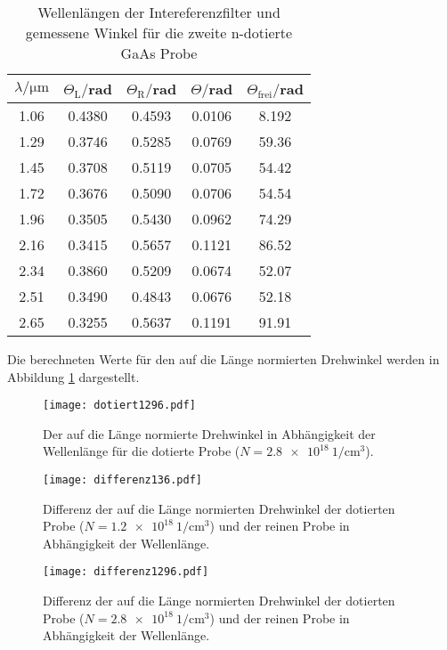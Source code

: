 \begin{table}[H]
  \centering
  \caption{Wellenlängen der Intereferenzfilter und gemessene Winkel für die zweite n-dotierte GaAs Probe}
  \label{tab:Parameter}
  \begin{tabular}{c c c c c}
    \toprule
    $\lambda/\mathrm{\mu m}$ & $\Theta_{\mathrm{L}}/$rad & $\Theta_{\mathrm{R}}/$rad  & $\Theta /$rad & $\Theta_{\mathrm{frei}}/$rad\\
    \midrule
    1.06  & 0.4380 & 0.4593 & 0.0106 & 8.192 \\
    1.29  & 0.3746 & 0.5285 & 0.0769 & 59.36 \\
    1.45  & 0.3708 & 0.5119 & 0.0705 & 54.42 \\
    1.72  & 0.3676 & 0.5090 & 0.0706 & 54.54 \\
    1.96  & 0.3505 & 0.5430 & 0.0962 & 74.29 \\
    2.16  & 0.3415 & 0.5657 & 0.1121 & 86.52 \\
    2.34  & 0.3860 & 0.5209 & 0.0674 & 52.07 \\
    2.51  & 0.3490 & 0.4843 & 0.0676 & 52.18 \\
    2.65  & 0.3255 & 0.5637 & 0.1191 & 91.91 \\
    \bottomrule
  \end{tabular}
\end{table}


Die berechneten Werte für den auf die Länge normierten Drehwinkel werden
in Abbildung \ref{fig:rein} dargestellt.
\begin{figure}[H]
  \centering
  \texttt{[image: dotiert1296.pdf]}
  \caption{Der auf die Länge normierte Drehwinkel in Abhängigkeit der Wellenlänge für die dotierte Probe ($N = \SI{2.8e18}{1\per\centi\meter^3}$).}
  \label{fig:rein}
\end{figure}

\begin{figure}[H]
  \centering
  \texttt{[image: differenz136.pdf]}
  \caption{Differenz der auf die Länge normierten Drehwinkel der dotierten Probe ($N = \SI{1.2e18}{1\per\centi\meter^3}$) und der reinen Probe in Abhängigkeit der Wellenlänge.}
  \label{fig:differenz136}
\end{figure}

\begin{figure}[H]
  \centering
  \texttt{[image: differenz1296.pdf]}
  \caption{Differenz der auf die Länge normierten Drehwinkel der dotierten Probe ($N = \SI{2.8e18}{1\per\centi\meter^3}$) und der reinen Probe in Abhängigkeit der Wellenlänge.}
  \label{fig:differenz1296}
\end{figure}
